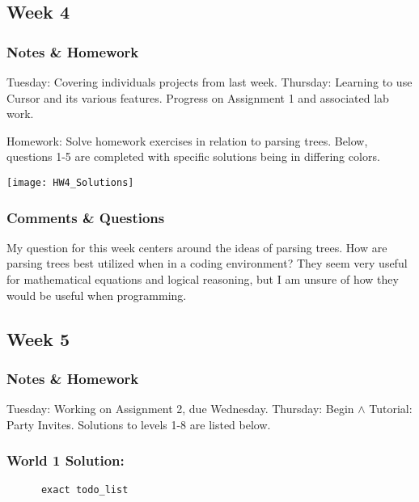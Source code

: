 \documentclass{article}
\theoremstyle{theorem}
\theoremstyle{definition}
\theoremstyle{remark}
\begin{document}
  \subsection{Week 4}

  \subsubsection{Notes \& Homework}
    Tuesday: Covering individuals projects from last week. 
    \newline Thursday: Learning to use Cursor and its various features. Progress on Assignment 1 and associated lab work.

    Homework: Solve homework exercises in relation to parsing trees. Below, questions 1-5 are completed with specific solutions being in differing colors.
    \graphicspath{ {C:/Users/jrmul/OneDrive/Documents/CPSC_Courses/CPSC_354/images/} }
    \begin{center} \texttt{[image: HW4\_Solutions]} \end{center}

  \subsubsection{Comments \& Questions}

  My question for this week centers around the ideas of parsing trees. How are parsing trees best utilized when in a coding environment? They seem very useful for mathematical equations and logical reasoning, but I am unsure of how they would be useful when programming.

  \subsection{Week 5}

  \subsubsection{Notes \& Homework}
  Tuesday: Working on Assignment 2, due Wednesday. 
  \newline Thursday: Begin $\wedge$ Tutorial: Party Invites. Solutions to levels 1-8 are listed below.

    \subsubsection*{World 1 Solution:}
    \begin{lstlisting}
      exact todo_list
    \end{lstlisting}
\end{document}
